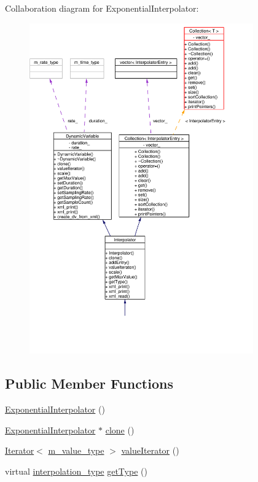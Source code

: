 Collaboration diagram for Exponential\-Interpolator:\begin{figure}[H]
\begin{center}
\leavevmode
\includegraphics[width=273pt]{classExponentialInterpolator__coll__graph}
\end{center}
\end{figure}
\subsection*{Public Member Functions}
\begin{CompactItemize}
\item 
\hyperlink{classExponentialInterpolator_a0}{Exponential\-Interpolator} ()
\item 
\hyperlink{classExponentialInterpolator}{Exponential\-Interpolator} $\ast$ \hyperlink{classExponentialInterpolator_a1}{clone} ()
\item 
\hyperlink{classIterator}{Iterator}$<$ \hyperlink{Types_8h_a3}{m\_\-value\_\-type} $>$ \hyperlink{classExponentialInterpolator_a2}{value\-Iterator} ()
\item 
virtual \hyperlink{Types_8h_a13}{interpolation\_\-type} \hyperlink{classExponentialInterpolator_a3}{get\-Type} ()
\end{CompactItemize}


